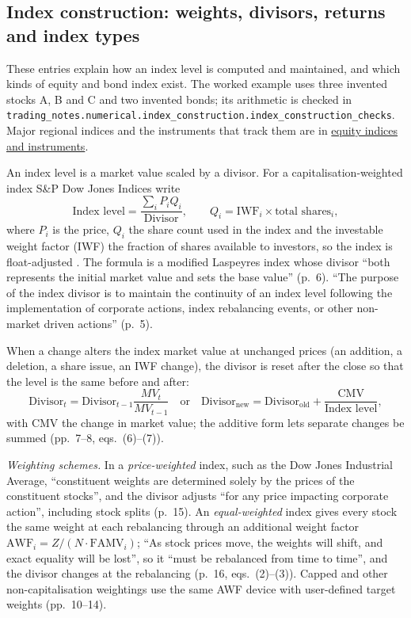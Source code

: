 \subsection{Index construction: weights, divisors, returns and index types}

These entries explain how an index level is computed and maintained, and which kinds of equity and bond index exist. The worked example uses three invented stocks A, B and C and two invented bonds; its arithmetic is checked in \nolinkurl{trading_notes.numerical.index_construction.index_construction_checks}. Major regional indices and the instruments that track them are in \hyperref[def:equity-indices-derivatives]{equity indices and instruments}.

\begin{qfmethod}\label{meth:index-value-return-calculation}
 An index level is a market value scaled by a divisor. For a capitalisation-weighted index S\&P Dow Jones Indices write
\[ \text{Index level}=\frac{\sum_i P_iQ_i}{\text{Divisor}},\qquad Q_i=\text{IWF}_i\times\text{total shares}_i, \]
where $P_i$ is the price, $Q_i$ the share count used in the index and the investable weight factor (IWF) the fraction of shares available to investors, so the index is float-adjusted \citep[pp.~6--7, eqs.~(1) and~(3)]{index-mathematics-methodology-2026}. The formula is a modified Laspeyres index whose divisor ``both represents the initial market value and sets the base value'' (p.~6). ``The purpose of the index divisor is to maintain the continuity of an index level following the implementation of corporate actions, index rebalancing events, or other non-market driven actions'' (p.~5).

When a change alters the index market value at unchanged prices (an addition, a deletion, a share issue, an IWF change), the divisor is reset after the close so that the level is the same before and after:
\[ \text{Divisor}_{t}=\text{Divisor}_{t-1}\frac{MV_t}{MV_{t-1}}\quad\text{or}\quad \text{Divisor}_{\text{new}}=\text{Divisor}_{\text{old}}+\frac{\text{CMV}}{\text{Index level}}, \]
with CMV the change in market value; the additive form lets separate changes be summed (pp.~7--8, eqs.~(6)--(7)).

\emph{Weighting schemes.} In a \emph{price-weighted} index, such as the Dow Jones Industrial Average, ``constituent weights are determined solely by the prices of the constituent stocks'', and the divisor adjusts ``for any price impacting corporate action'', including stock splits (p.~15). An \emph{equal-weighted} index gives every stock the same weight at each rebalancing through an additional weight factor $\text{AWF}_i=Z/(N\cdot\text{FAMV}_i)$; ``As stock prices move, the weights will shift, and exact equality will be lost'', so it ``must be rebalanced from time to time'', and the divisor changes at the rebalancing (p.~16, eqs.~(2)--(3)). Capped and other non-capitalisation weightings use the same AWF device with user-defined target weights (pp.~10--14).


\end{qfmethod}
